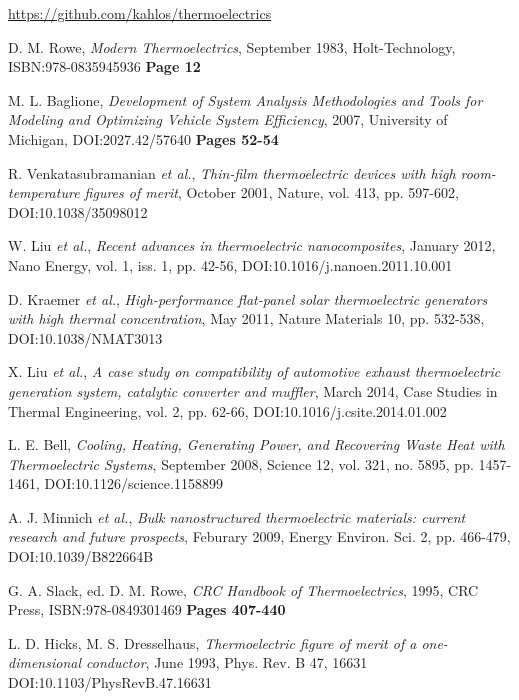\documentclass[12pt,draft]{article}
\begin{document}
\url{https://github.com/kahlos/thermoelectrics}

\begin{thebibliography}{11}

D. M. Rowe,
\emph{Modern Thermoelectrics},
September 1983,
Holt-Technology,
ISBN:978-0835945936
\textbf{Page 12}

M. L. Baglione,
\emph{Development of System Analysis Methodologies and Tools for Modeling and Optimizing Vehicle System Efficiency},
2007,
University of Michigan,
DOI:2027.42/57640
\textbf{Pages 52-54}

R. Venkatasubramanian \emph{et al.},
\emph{Thin-film thermoelectric devices with high room-temperature figures of merit},
October 2001,
Nature, vol. 413, pp. 597-602,
DOI:10.1038/35098012

W. Liu \emph{et al.},
\emph{Recent advances in thermoelectric nanocomposites},
January 2012,
Nano Energy, vol. 1, iss. 1, pp. 42-56,
DOI:10.1016/j.nanoen.2011.10.001

D. Kraemer \emph{et al.},
\emph{High-performance flat-panel solar thermoelectric
generators with high thermal concentration},
May 2011,
Nature Materials 10, pp. 532-538,
DOI:10.1038/NMAT3013

X. Liu \emph{et al.},
\emph{A case study on compatibility of automotive exhaust thermoelectric generation system, catalytic converter and muffler},
March 2014,
Case Studies in Thermal Engineering, vol. 2, pp. 62-66,
DOI:10.1016/j.csite.2014.01.002

L. E. Bell,
\emph{Cooling, Heating, Generating Power, and Recovering Waste Heat with Thermoelectric Systems},
September 2008,
Science 12, vol. 321, no. 5895, pp. 1457-1461,
DOI:10.1126/science.1158899

A. J. Minnich \emph{et al.},
\emph{Bulk nanostructured thermoelectric materials: current research and future prospects},
Feburary 2009,
Energy Environ. Sci. 2, pp. 466-479,
DOI:10.1039/B822664B

G. A. Slack, ed. D. M. Rowe,
\emph{CRC Handbook of Thermoelectrics},
1995,
CRC Press,
ISBN:978-0849301469
\textbf{Pages 407-440}

L. D. Hicks, M. S. Dresselhaus,
\emph{Thermoelectric figure of merit of a one-dimensional conductor},
June 1993,
Phys. Rev. B 47, 16631
DOI:10.1103/PhysRevB.47.16631


\end{thebibliography}
\end{document}
